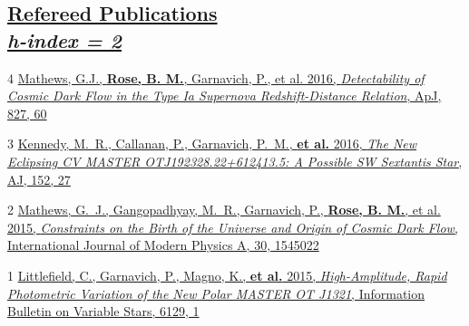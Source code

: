 \documentclass[margin]{res}
\begin{document}
\begin{resume}
\begin{comment}
\end{comment}




\section{\href{https://ui.adsabs.harvard.edu/\#search/q=orcid\%3A\%220000-0002-1873-8973\%22&sort=date\%20desc\%2C\%20bibcode\%20desc}{Refereed Publications \\ \href{https://scholar.google.com/citations?hl=en&user=7mgK134AAAAJ&view_op=list_works&gmla=AJsN-F6iePLN4Wjqx0zevRVxlzTXpDc-4tgHh3F1l7HgQKDk5_zZb36GX5SIz-2kA3vZQ80qinI8RGivZtpLqS9oI6iUuXFfSbvz_aHJrcP1iCaBmNpgHB0}{\normalfont \textit{\small{h-index = 2}}}} }

\hangindent=15pt {\footnotesize \textcolor{light-gray}{4}} \href{https://ui.adsabs.harvard.edu/#abs/2016ApJ...827...60M/abstract}{Mathews, G.J., {\bf Rose, B. M.}, Garnavich, P., et al. 2016, {\sl Detectability of Cosmic Dark Flow in the Type Ia Supernova Redshift-Distance Relation}, ApJ, 827, 60}

\vspace{-12pt}
\hangindent=15pt {\footnotesize \textcolor{light-gray}{3}} \href{https://ui.adsabs.harvard.edu/#abs/2016AJ....152...27K/abstract}{Kennedy, M.~R., Callanan, P., Garnavich, P.~M., {\bf et al.} 2016, {\sl The New Eclipsing CV MASTER OTJ192328.22+612413.5: A Possible SW Sextantis Star}, AJ, 152, 27}

\vspace{-12pt}
\hangindent=15pt {\footnotesize \textcolor{light-gray}{2}} \href{https://ui.adsabs.harvard.edu/#abs/2015IJMPA..3045022M/abstract}{Mathews, G.~J., Gangopadhyay, M.~R., Garnavich, P., {\bf Rose, B. M.}, et al. 2015, {\sl Constraints on the Birth of the Universe and Origin of Cosmic Dark Flow}, International Journal of Modern Physics A, 30, 1545022}

\vspace{-12pt}
\hangindent=15pt {\footnotesize \textcolor{light-gray}{1}} \href{https://ui.adsabs.harvard.edu/#abs/2015IBVS.6129....1L/abstract}{Littlefield, C., Garnavich, P., Magno, K., {\bf et al.} 2015, {\sl High-Amplitude, Rapid Photometric Variation of the New Polar MASTER OT J1321}, Information Bulletin on Variable Stars, 6129, 1}





\end{resume}
\end{document}

